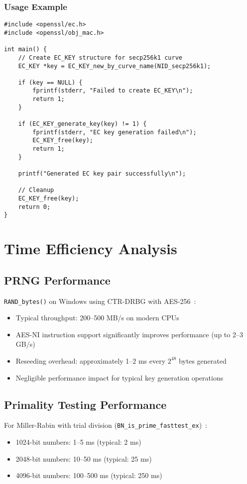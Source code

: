 \subsubsection{Usage Example}
\begin{verbatim}
#include <openssl/ec.h>
#include <openssl/obj_mac.h>

int main() {
    // Create EC_KEY structure for secp256k1 curve
    EC_KEY *key = EC_KEY_new_by_curve_name(NID_secp256k1);
    
    if (key == NULL) {
        fprintf(stderr, "Failed to create EC_KEY\n");
        return 1;
    }
    
    if (EC_KEY_generate_key(key) != 1) {
        fprintf(stderr, "EC key generation failed\n");
        EC_KEY_free(key);
        return 1;
    }
    
    printf("Generated EC key pair successfully\n");
    
    // Cleanup
    EC_KEY_free(key);
    return 0;
}
\end{verbatim}

\section{Time Efficiency Analysis}

\subsection{PRNG Performance}
\texttt{RAND\_bytes()} on Windows using CTR-DRBG with AES-256~\cite{barker2015recommendation}:
\begin{itemize}
    \item Typical throughput: 200--500 MB/s on modern CPUs
    \item AES-NI instruction support significantly improves performance (up to 2--3 GB/s)
    \item Reseeding overhead: approximately 1--2 ms every $2^{48}$ bytes generated
    \item Negligible performance impact for typical key generation operations
\end{itemize}

\subsection{Primality Testing Performance}
For Miller-Rabin with trial division (\texttt{BN\_is\_prime\_fasttest\_ex})~\cite{crandall2005prime}:
\begin{itemize}
    \item 1024-bit numbers: 1--5 ms (typical: 2 ms)
    \item 2048-bit numbers: 10--50 ms (typical: 25 ms)
    \item 4096-bit numbers: 100--500 ms (typical: 250 ms)
\end{itemize}

